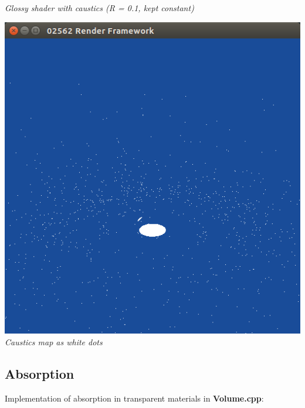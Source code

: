 \documentclass[a4,12pt]{article}
\begin{document}
\begin{center}
\begin{minipage}[b]{0.40\linewidth}
\begin{center}
				\textit{Glossy shader with caustics (R = 0.1, kept constant)}\\
			\end{center}
		\end{minipage}
	\end{center}
	
	\begin{center}
		\begin{center}
		\begin{minipage}[b]{0.40\linewidth}
			\begin{center}
				\includegraphics[width = \textwidth]{./Worksheet8/causticdots.png}\\
				\textit{Caustics map as white dots}\\
			\end{center}
		\end{minipage}
	\end{center}
	\end{center}
	
	\subsection{Absorption}
	Implementation of absorption in transparent materials in \textbf{Volume.cpp}:
	
\end{document}
